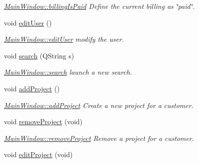 \begin{DoxyCompactItemize}
\begin{DoxyCompactList}\small\item\em \hyperlink{classGui_1_1MainWindow_a149c8e2210fa249c0510e1f607079fde}{Main\+Window\+::billing\+Is\+Paid} Define the current billing as \char`\"{}paid\char`\"{}. \end{DoxyCompactList}\item 
void \hyperlink{classGui_1_1MainWindow_a5dfb182cf52eb48f71e70cd193ef7a8b}{edit\+User} ()
\begin{DoxyCompactList}\small\item\em \hyperlink{classGui_1_1MainWindow_a5dfb182cf52eb48f71e70cd193ef7a8b}{Main\+Window\+::edit\+User} modify the user. \end{DoxyCompactList}\item 
void \hyperlink{classGui_1_1MainWindow_af50656b4c43aa53bae1ac4a3d6b4c953}{search} (Q\+String s)
\begin{DoxyCompactList}\small\item\em \hyperlink{classGui_1_1MainWindow_af50656b4c43aa53bae1ac4a3d6b4c953}{Main\+Window\+::search} launch a new search. \end{DoxyCompactList}\item 
void \hyperlink{classGui_1_1MainWindow_acc49a5a35dfc7eb8f835ff425618e2d9}{add\+Project} ()
\begin{DoxyCompactList}\small\item\em \hyperlink{classGui_1_1MainWindow_acc49a5a35dfc7eb8f835ff425618e2d9}{Main\+Window\+::add\+Project} Create a new project for a customer. \end{DoxyCompactList}\item 
\hypertarget{classGui_1_1MainWindow_a7e00765c3da7a97ba937bdecb095200b}{}void \hyperlink{classGui_1_1MainWindow_a7e00765c3da7a97ba937bdecb095200b}{remove\+Project} (void)\label{classGui_1_1MainWindow_a7e00765c3da7a97ba937bdecb095200b}

\begin{DoxyCompactList}\small\item\em \hyperlink{classGui_1_1MainWindow_a7e00765c3da7a97ba937bdecb095200b}{Main\+Window\+::remove\+Project} Remove a project for a customer. \end{DoxyCompactList}\item 
\hypertarget{classGui_1_1MainWindow_adade8f873eb855b2ca0bb851c91cc5a9}{}void \hyperlink{classGui_1_1MainWindow_adade8f873eb855b2ca0bb851c91cc5a9}{edit\+Project} (void)\label{classGui_1_1MainWindow_adade8f873eb855b2ca0bb851c91cc5a9}


\end{DoxyCompactItemize}
